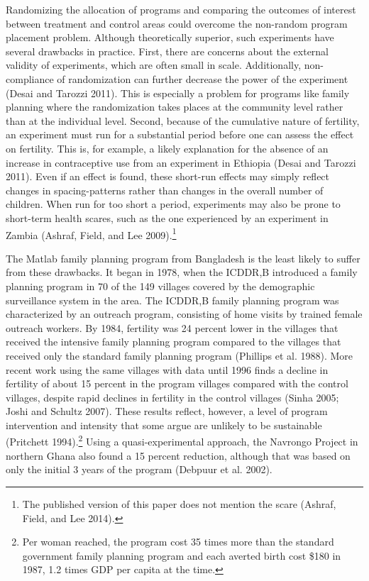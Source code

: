 \documentclass[]{article}
\begin{document}
Randomizing the allocation of programs and comparing the outcomes of interest between treatment and control areas could overcome the non-random program placement problem. Although theoretically superior, such experiments have several drawbacks in practice. First, there are concerns about the external validity of experiments, which are often small in scale. Additionally, non-compliance of randomization can further decrease the power of the experiment (Desai and Tarozzi 2011). This is especially a problem for programs like family planning where the randomization takes places at the community level rather than at the individual level. Second, because of the cumulative nature of fertility, an experiment must run for a substantial period before one can assess the effect on fertility. This is, for example, a likely explanation for the absence of an increase in contraceptive use from an experiment in Ethiopia (Desai and Tarozzi 2011). Even if an effect is found, these short-run effects may simply reflect changes in spacing-patterns rather than changes in the overall number of children. When run for too short a period, experiments may also be prone to short-term health scares, such as the one experienced by an experiment in Zambia (Ashraf, Field, and Lee 2009).\footnote{The published version of this paper does not mention the scare (Ashraf, Field, and Lee 2014).}

The Matlab family planning program from Bangladesh is the least likely to suffer from these drawbacks. It began in 1978, when the ICDDR,B introduced a family planning program in 70 of the 149 villages covered by the demographic surveillance system in the area. The ICDDR,B family planning program was characterized by an outreach program, consisting of home visits by trained female outreach workers. By 1984, fertility was 24 percent lower in the villages that received the intensive family planning program compared to the villages that received only the standard family planning program (Phillips et al. 1988). More recent work using the same villages with data until 1996 finds a decline in fertility of about 15 percent in the program villages compared with the control villages, despite rapid declines in fertility in the control villages (Sinha 2005; Joshi and Schultz 2007). These results reflect, however, a level of program intervention and intensity that some argue are unlikely to be sustainable (Pritchett 1994).\footnote{Per woman reached, the program cost 35 times more than the standard government family planning program and each averted birth cost \$180 in 1987, 1.2 times GDP per capita at the time.} Using a quasi-experimental approach, the Navrongo Project in northern Ghana also found a 15 percent reduction, although that was based on only the initial 3 years of the program (Debpuur et al. 2002).
\end{document}
